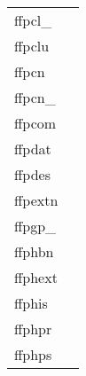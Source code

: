 \documentclass[11pt]{book}
\begin{document}
\begin{tabular}{lr}
ffpcl\_     & \pageref{ffpclx} \\
ffpclu      & \pageref{ffpclu} \\
ffpcn    & \pageref{ffpcn} \\
ffpcn\_ & \pageref{ffpcnx} \\
ffpcom      & \pageref{ffpcom} \\
ffpdat         & \pageref{ffpdat} \\
ffpdes  & \pageref{ffpdes} \\
ffpextn        & \pageref{ffgextn} \\
ffpgp\_ & \pageref{ffpgpx} \\
ffphbn      & \pageref{ffphbn} \\
ffphext       & \pageref{ffphpr} \\
ffphis      & \pageref{ffphis} \\
ffphpr       & \pageref{ffphpr} \\
ffphps       & \pageref{ffphps} \\

\end{tabular}
\end{document}
